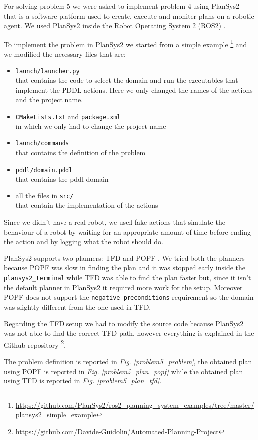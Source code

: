 For solving problem 5 we were asked to implement problem 4 using PlanSys2 \cite{plansys2} that is a software platform used to create, execute and monitor plans on a robotic agent. We used PlanSys2 inside the 
Robot Operating System 2 (ROS2) \cite{ros2}.

To implement the problem in PlanSys2 we started from a simple example \footnote{\url{https://github.com/PlanSys2/ros2_planning_system_examples/tree/master/plansys2_simple_example}} and we modified the necessary files that are:
\begin{itemize}
    \item \verb+launch/launcher.py+ \\ 
    that contains the code to select the domain and run the executables that implement the PDDL actions. Here we only changed the names of the actions and the project name.
    \item \verb+CMakeLists.txt+ and \verb+package.xml+ \\
    in which we only had to change the project name
    \item \verb+launch/commands+ \\
    that contains the definition of the problem
    \item \verb+pddl/domain.pddl+ \\
    that contains the pddl domain
    \item all the files in \verb+src/+ \\
    that contain the implementation of the actions
\end{itemize}

Since we didn't have a real robot, we used fake actions that simulate the 
behaviour of a robot by waiting for an appropriate amount of time before ending the action and by logging what the robot should do.

PlanSys2 supports two planners: TFD \cite{tfd} and POPF \cite{popf}.
We tried both the planners because POPF was slow in finding the plan and it 
was stopped early inside the \verb+plansys2_terminal+ while TFD was able to find the plan faster but, since it isn't the default planner in PlanSys2 it required more work for the setup. Moreover POPF does not support the \verb+negative-preconditions+ requirement so the domain was slightly different from the one used in TFD.

Regarding the TFD setup we had to modify the source code because PlanSys2 was not able to find the correct TFD path, however everything is explained in the Github repository \footnote{\url{https://github.com/Davide-Guidolin/Automated-Planning-Project}}.

The problem definition is reported in \textit{Fig. \ref{problem5_problem}}, the obtained plan using POPF is reported in \textit{Fig. \ref{problem5_plan_popf}} while the obtained plan using TFD is reported in \textit{Fig. \ref{problem5_plan_tfd}}.